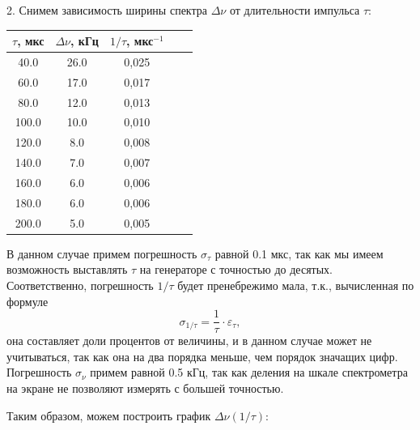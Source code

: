 \documentclass[14pt]{article}
\begin{document}
2. Снимем зависимость ширины спектра $\Delta\nu$ от длительности импульса $\tau$:

\begin{center}
\begin{tabular}{|c|c|c|c|c|}
\hline
$\tau$, мкс&$\Delta\nu$, кГц&$1/\tau$, мкс$^{-1}$\\
\hline
40.0&26.0&0,025\\
\hline
60.0&17.0&0,017\\
\hline
80.0&12.0&0,013\\
\hline
100.0&10.0&0,010\\
\hline
120.0&8.0&0,008\\
\hline
140.0&7.0&0,007\\
\hline
160.0&6.0&0,006\\
\hline
180.0&6.0&0,006\\
\hline
200.0&5.0&0,005\\
\hline
\end{tabular}
\end{center}

В данном случае примем погрешность $\sigma_\tau$ равной 0.1 мкс, так как мы имеем возможность выставлять $\tau$ на генераторе с точностью до десятых. Соответственно, погрешность $1/\tau$ будет пренебрежимо мала, т.к., вычисленная по формуле
$$
	\sigma_{1/\tau} = \frac{1}{\tau}\cdot \varepsilon_\tau,
$$
\noindent она составляет доли процентов от величины, и в данном случае может не учитываться, так как она на два порядка меньше, чем порядок значащих цифр. Погрешность $\sigma_\nu$ примем равной 0.5 кГц, так как деления на шкале спектрометра на экране не позволяют измерять с большей точностью.

Таким образом, можем построить график $\Delta\nu(1/\tau)$:

\vspace{1cm}
\end{document}
